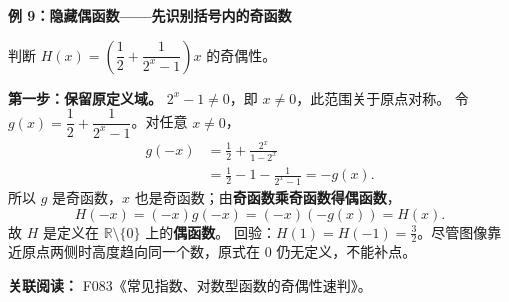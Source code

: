 \clearpage
\begin{examplebox}
\textbf{\textcolor{CExample}{例 9：隐藏偶函数——先识别括号内的奇函数}}

判断 $H(x)=\left(\dfrac12+\dfrac1{2^x-1}\right)x$ 的奇偶性。

\textbf{第一步：保留原定义域。} $2^x-1\ne0$，即 $x\ne0$，此范围关于原点对称。
令 $g(x)=\dfrac12+\dfrac1{2^x-1}$。对任意 $x\ne0$，
\[
\begin{aligned}
g(-x)&=\frac12+\frac{2^x}{1-2^x}\\
&=\frac12-1-\frac1{2^x-1}=-g(x).
\end{aligned}
\]
所以 $g$ 是奇函数，$x$ 也是奇函数；由\textbf{奇函数乘奇函数得偶函数}，
\[
H(-x)=(-x)g(-x)=(-x)(-g(x))=H(x).
\]
故 $H$ 是定义在 $\mathbb R\setminus\{0\}$ 上的\textbf{偶函数}。
回验：$H(1)=H(-1)=\frac32$。尽管图像靠近原点两侧时高度趋向同一个数，原式在 $0$ 仍无定义，不能补点。

\textbf{关联阅读：} F083《常见指数、对数型函数的奇偶性速判》。
\end{examplebox}
